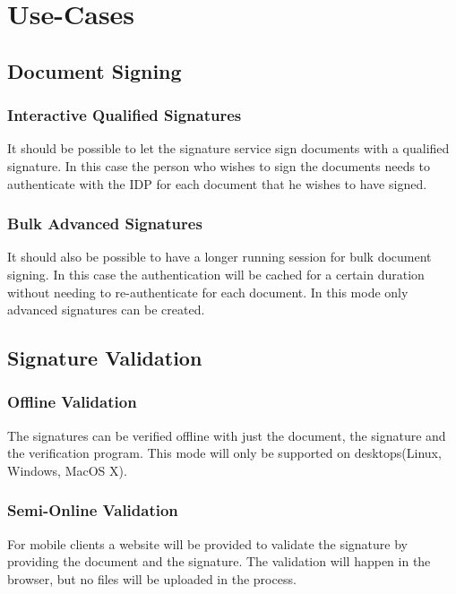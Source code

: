\chapter{Use-Cases}
\label{ch:usecases}

\section{Document Signing}

\subsection{Interactive Qualified Signatures}
It should be possible to let the signature service sign documents with a qualified signature.
In this case the person who wishes to sign the documents needs to authenticate with the IDP for each document that he wishes to have signed.

\subsection{Bulk Advanced Signatures}
It should also be possible to have a longer running session for bulk document signing.
In this case the authentication will be cached for a certain duration without needing to re-authenticate for each document.
In this mode only advanced signatures can be created.

\section{Signature Validation}

\subsection{Offline Validation}
The signatures can be verified offline with just the document, the signature and the verification program.
This mode will only be supported on desktops(Linux, Windows, MacOS X).

\subsection{Semi-Online Validation}
For mobile clients a website will be provided to validate the signature by providing the document and the signature.
The validation will happen in the browser, but no files will be uploaded in the process.